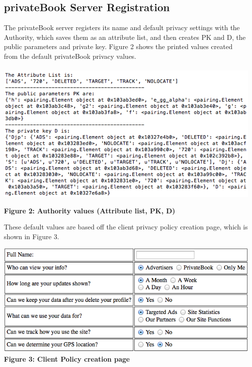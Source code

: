 \documentclass[12pt]{article}
\begin{document}
\subsection{privateBook Server Registration}
The privateBook server registers its name and default privacy settings with the Authority, which saves them as an attribute list, and then creates PK and D, the public parameters and private key. Figure 2 shows the printed values created from the default privateBook privacy values. \\ \\
\includegraphics[scale=.705]{authority3.png}
\begin{center}
\textbf{Figure 2: Authority values (Attribute list, PK, D)}
\end{center}
These default values are based off the client privacy policy creation page, which is shown in Figure 3. \\
\begin{center}
\includegraphics[scale=.55]{policycreation.png} \\
\textbf{Figure 3: Client Policy creation page}
\end{center}
\end{document}
